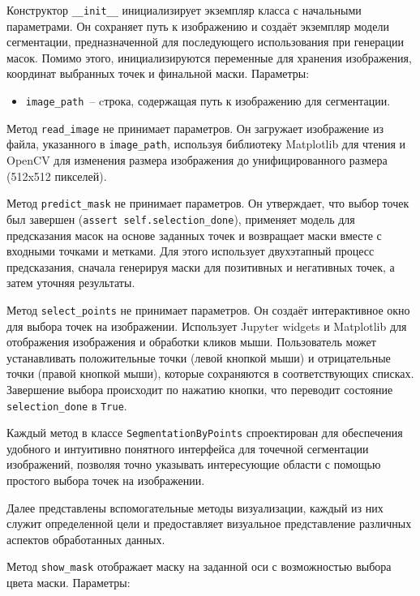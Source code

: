 Конструктор \lstinline{__init__} инициализирует экземпляр класса с начальными параметрами. Он сохраняет путь к изображению и создаёт экземпляр модели сегментации, предназначенной для последующего использования при генерации масок. Помимо этого, инициализируются переменные для хранения изображения, координат выбранных точек и финальной маски. Параметры:

\begin{itemize}
    \item \lstinline{image_path}~-- cтрока, содержащая путь к изображению для сегментации.
\end{itemize}

Метод \lstinline{read_image} не принимает параметров. Он загружает изображение из файла, указанного в \lstinline{image_path}, используя библиотеку Matplotlib для чтения и OpenCV для изменения размера изображения до унифицированного размера (512x512 пикселей).

Метод \lstinline{predict_mask} не принимает параметров. Он утверждает, что выбор точек был завершен (\lstinline{assert self.selection_done}), применяет модель для предсказания масок на основе заданных точек и возвращает маски вместе с входными точками и метками. Для этого использует двухэтапный процесс предсказания, сначала генерируя маски для позитивных и негативных точек, а затем уточняя результаты.

Метод \lstinline{select_points} не принимает параметров. Он создаёт интерактивное окно для выбора точек на изображении. Использует Jupyter widgets и Matplotlib для отображения изображения и обработки кликов мыши. Пользователь может устанавливать положительные точки (левой кнопкой мыши) и отрицательные точки (правой кнопкой мыши), которые сохраняются в соответствующих списках. Завершение выбора происходит по нажатию кнопки, что переводит состояние \lstinline{selection_done} в \lstinline{True}.

Каждый метод в классе \lstinline{SegmentationByPoints} спроектирован для обеспечения удобного и интуитивно понятного интерфейса для точечной сегментации изображений, позволяя точно указывать интересующие области с помощью простого выбора точек на изображении.

Далее представлены вспомогательные методы визуализации, каждый из них служит определенной цели и предоставляет визуальное представление различных аспектов обработанных данных.

Метод \lstinline{show_mask} отображает маску на заданной оси с возможностью выбора цвета маски. Параметры:

